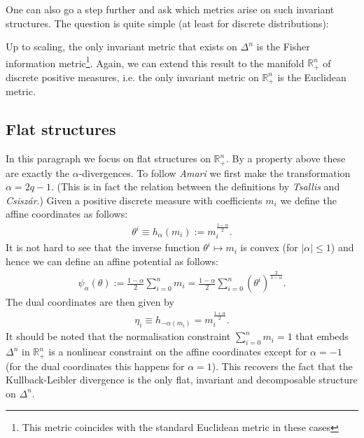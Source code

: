     One can also go a step further and ask which metrics arise on such invariant structures. The question is quite simple (at least for discrete distributions):
    \begin{theorem}[Chentsov]
        Up to scaling, the only invariant metric that exists on $\Delta^n$ is the Fisher information metric\footnote{This metric coincides with the standard Euclidean metric in these cases}. Again, we can extend this result to the manifold $\mathbb{R}^n_+$ of discrete positive measures, i.e. the only invariant metric on $\mathbb{R}^n_+$ is the Euclidean metric.
    \end{theorem}

\subsection{Flat structures}

    In this paragraph we focus on flat structures on $\mathbb{R}^n_+$. By a property above these are exactly the $\alpha$-divergences. To follow \textit{Amari} we first make the transformation $\alpha=2q-1$. (This is in fact the relation between the definitions by \textit{Tsallis} and \textit{Csisz\'ar}.) Given a positive discrete measure with coefficients $m_i$ we define the affine coordinates as follows:
    \begin{gather}
        \theta^i \equiv h_\alpha(m_i) := m_i^{\frac{1-\alpha}{2}}.
    \end{gather}
    It is not hard to see that the inverse function $\theta^i\mapsto m_i$ is convex (for $|\alpha|\leq1$) and hence we can define an affine potential as follows:
    \begin{gather}
        \psi_\alpha(\theta) := \frac{1-\alpha}{2}\sum_{i=0}^n m_i = \frac{1-\alpha}{2}\sum_{i=0}^n \left(\theta^i\right)^{\frac{2}{1-\alpha}}.
    \end{gather}
    The dual coordinates are then given by
    \begin{gather}
        \eta_i \equiv h_{-\alpha(m_i)} = m_i^{\frac{1+\alpha}{2}}.
    \end{gather}
    It should be noted that the normalisation constraint $\sum_{i=0}^nm_i=1$ that embeds $\Delta^n$ in $\mathbb{R}^n_+$ is a nonlinear constraint on the affine coordinates except for $\alpha=-1$ (for the dual coordinates this happens for $\alpha=1$). This recovers the fact that the Kullback-Leibler divergence is the only flat, invariant and decomposable structure on $\Delta^n$.

